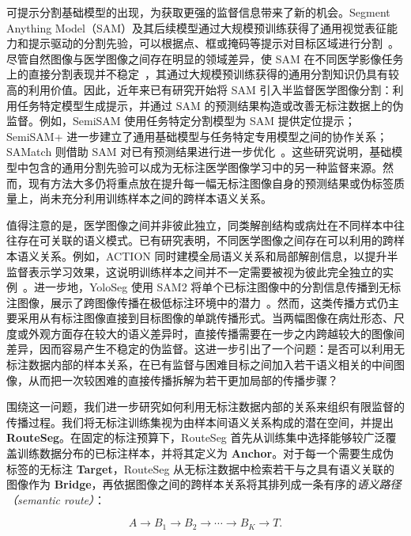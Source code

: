 \documentclass[UTF8,a4paper,10pt]{ctexart}
\begin{document}
可提示分割基础模型的出现，为获取更强的监督信息带来了新的机会。Segment Anything Model（SAM）及其后续模型通过大规模预训练获得了通用视觉表征能力和提示驱动的分割先验，可以根据点、框或掩码等提示对目标区域进行分割~\cite{kirillov2023segment}。尽管自然图像与医学图像之间存在明显的领域差异，使 SAM 在不同医学影像任务上的直接分割表现并不稳定~\cite{mazurowski2023samexperiment,ma2024medsam}，其通过大规模预训练获得的通用分割知识仍具有较高的利用价值。因此，近年来已有研究开始将 SAM 引入半监督医学图像分割：利用任务特定模型生成提示，并通过 SAM 的预测结果构造或改善无标注数据上的伪监督。例如，SemiSAM 使用任务特定分割模型为 SAM 提供定位提示；SemiSAM+ 进一步建立了通用基础模型与任务特定专用模型之间的协作关系；SAMatch 则借助 SAM 对已有预测结果进行进一步优化~\cite{zhang2023semisam,zhang2025semisamplus,xu2024samatch}。这些研究说明，基础模型中包含的通用分割先验可以成为无标注医学图像学习中的另一种监督来源。然而，现有方法大多仍将重点放在提升每一幅无标注图像自身的预测结果或伪标签质量上，尚未充分利用训练样本之间的跨样本语义关系。

值得注意的是，医学图像之间并非彼此独立，同类解剖结构或病灶在不同样本中往往存在可关联的语义模式。已有研究表明，不同医学图像之间存在可以利用的跨样本语义关系。例如，ACTION 同时建模全局语义关系和局部解剖信息，以提升半监督表示学习效果，这说明训练样本之间并不一定需要被视为彼此完全独立的实例~\cite{you2022action}。进一步地，YoloSeg 使用 SAM2 将单个已标注图像中的分割信息传播到无标注图像，展示了跨图像传播在极低标注环境中的潜力~\cite{zhang2026yoloseg}。然而，这类传播方式仍主要采用从有标注图像直接到目标图像的单跳传播形式。当两幅图像在病灶形态、尺度或外观方面存在较大的语义差异时，直接传播需要在一步之内跨越较大的图像间差异，因而容易产生不稳定的伪监督。这进一步引出了一个问题：是否可以利用无标注数据内部的样本关系，在已有监督与困难目标之间加入若干语义相关的中间图像，从而把一次较困难的直接传播拆解为若干更加局部的传播步骤？

围绕这一问题，我们进一步研究如何利用无标注数据内部的关系来组织有限监督的传播过程。我们将无标注训练集视为由样本间语义关系构成的潜在空间，并提出 \textbf{RouteSeg}。在固定的标注预算下，RouteSeg 首先从训练集中选择能够较广泛覆盖训练数据分布的已标注样本，并将其定义为 \textbf{Anchor}。对于每一个需要生成伪标签的无标注 \textbf{Target}，RouteSeg 从无标注数据中检索若干与之具有语义关联的图像作为 \textbf{Bridge}，再依据图像之间的跨样本关系将其排列成一条有序的\emph{语义路径（semantic route）}：

\begin{equation}
A \rightarrow B_1 \rightarrow B_2 \rightarrow \cdots \rightarrow B_K \rightarrow T.
\end{equation}
\end{document}
